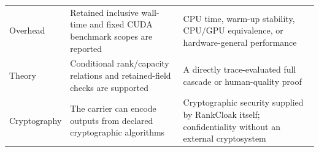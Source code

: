\documentclass[fleqn,10pt]{wlscirep}
\begin{document}
\begin{longtable}{L{0.25\textwidth}L{0.31\textwidth}L{0.35\textwidth}}
Overhead & Retained inclusive wall-time and fixed CUDA benchmark scopes are reported & CPU time, warm-up stability, CPU/GPU equivalence, or hardware-general performance \\
Theory & Conditional rank/capacity relations and retained-field checks are supported & A directly trace-evaluated full cascade or human-quality proof \\
Cryptography & The carrier can encode outputs from declared cryptographic algorithms & Cryptographic security supplied by RankCloak itself; confidentiality without an external cryptosystem \\
\bottomrule
\end{longtable}


\end{document}
